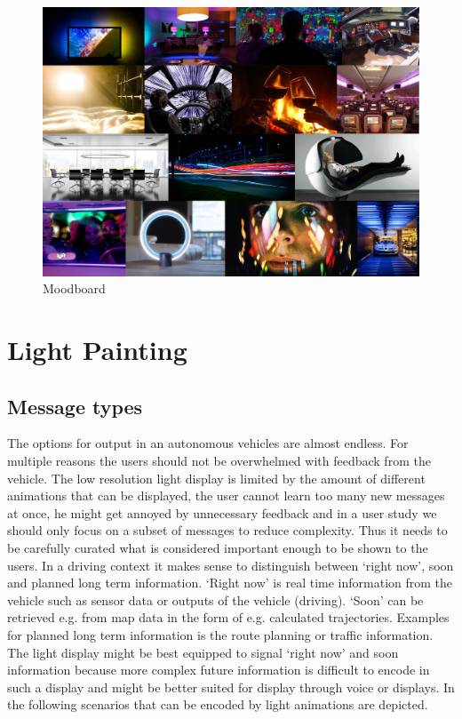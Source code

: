\begin{figure}
\centering
    \includegraphics[width=1.\textwidth]{fig/moodboard_G.jpg}
    \caption[Moodboard]{Moodboard}
    \label{fig:smoodboard}
\end{figure}
\section{Light Painting}
\label{sec:lightPainting}
\subsection{Message types}
The options for output in an autonomous vehicles are almost endless. For multiple reasons the users should not be overwhelmed with feedback from the vehicle. The low resolution light display is limited by the amount of different animations that can be displayed, the user cannot learn too many new messages at once, he might get annoyed by unnecessary feedback and in a user study we should only focus on a subset of messages to reduce complexity. Thus it needs to be carefully curated what is considered important enough to be shown to the users. In a driving context it makes sense to distinguish between ‘right now’, soon and planned long term information. ‘Right now’ is real time information from the vehicle such as sensor data or outputs of the vehicle (driving). ‘Soon’ can be retrieved e.g. from map data in the form of e.g. calculated trajectories. Examples for planned long term information is the route planning or traffic information. The light display might be best equipped to signal ‘right now’ and soon information because more complex future information is difficult to encode in such a display and might be better suited for display through voice or displays. In the following scenarios that can be encoded by light animations are depicted. 

